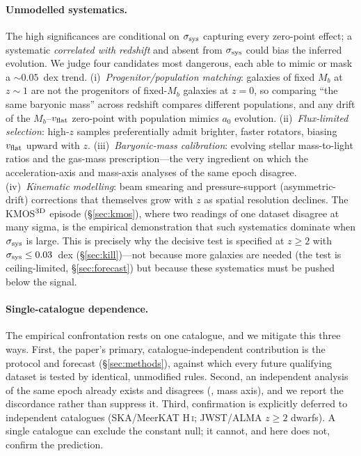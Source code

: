 \documentclass[fleqn,usenatbib]{mnras}
\newcommand{\azero}{a_0}
\newcommand{\ssys}{\sigma_{\rm sys}}
\begin{document}
\paragraph{Unmodelled systematics.} The high significances are conditional on $\ssys$
capturing every zero-point effect; a systematic \emph{correlated with redshift} and
absent from $\ssys$ could bias the inferred evolution. We judge four candidates most
dangerous, each able to mimic or mask a $\sim0.05$~dex trend.
(i)~\emph{Progenitor/population matching}: galaxies of fixed $M_b$ at $z\sim1$ are not
the progenitors of fixed-$M_b$ galaxies at $z=0$, so comparing ``the same baryonic
mass'' across redshift compares different populations, and any drift of the
$M_b$--$v_{\rm flat}$ zero-point with population mimics $\azero$ evolution.
(ii)~\emph{Flux-limited selection}: high-$z$ samples preferentially admit brighter,
faster rotators, biasing $v_{\rm flat}$ upward with $z$.
(iii)~\emph{Baryonic-mass calibration}: evolving stellar mass-to-light ratios and the
gas-mass prescription---the very ingredient on which the acceleration-axis
\citep{Ciocan2026} and mass-axis \citep{Jeanneau2026} analyses of the same epoch
disagree.
(iv)~\emph{Kinematic modelling}: beam smearing and pressure-support (asymmetric-drift)
corrections that themselves grow with $z$ as spatial resolution declines.
The KMOS$^{3\rm D}$ episode (\S\ref{sec:kmos}), where two readings of one dataset
disagree at many sigma, is the empirical demonstration that such systematics dominate
when $\ssys$ is large. This is precisely why the decisive test is specified at
$z\ge2$ with $\ssys\le0.03$~dex (\S\ref{sec:kill})---not because more galaxies are
needed (the test is ceiling-limited, \S\ref{sec:forecast}) but because these
systematics must be pushed below the signal.

\paragraph{Single-catalogue dependence.} The empirical confrontation rests on one
catalogue, and we mitigate this three ways. First, the paper's primary,
catalogue-independent contribution is the protocol and forecast (\S\ref{sec:methods}),
against which every future qualifying dataset is tested by identical, unmodified
rules. Second, an independent analysis of the same epoch already exists and disagrees
(\citealt{Jeanneau2026}, mass axis), and we report the discordance rather than
suppress it. Third, confirmation is explicitly deferred to independent catalogues
(SKA/MeerKAT H\,\textsc{i}; JWST/ALMA $z\ge2$ dwarfs). A single catalogue can exclude
the constant null; it cannot, and here does not, confirm the prediction.
\end{document}
